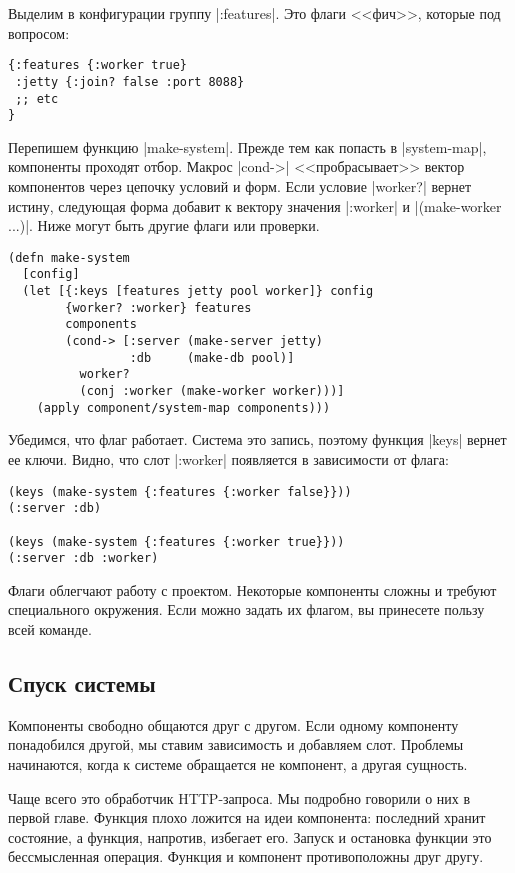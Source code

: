 Выделим в конфигурации группу \spverb|:features|. Это флаги <<фич>>, которые под
вопросом:

\begin{verbatim}
{:features {:worker true}
 :jetty {:join? false :port 8088}
 ;; etc
}
\end{verbatim}

Перепишем функцию \spverb|make-system|. Прежде тем как попасть в
\spverb|system-map|, компоненты проходят отбор. Макрос \spverb|cond->|
<<пробрасывает>> вектор компонентов через цепочку условий и форм. Если условие
\spverb|worker?| вернет истину, следующая форма добавит к вектору значения
\spverb|:worker| и \spverb|(make-worker {...})|. Ниже могут быть другие флаги
или проверки.


\begin{verbatim}
(defn make-system
  [config]
  (let [{:keys [features jetty pool worker]} config
        {worker? :worker} features
        components
        (cond-> [:server (make-server jetty)
                 :db     (make-db pool)]
          worker?
          (conj :worker (make-worker worker)))]
    (apply component/system-map components)))
\end{verbatim}

Убедимся, что флаг работает. Система это запись, поэтому функция \spverb|keys|
вернет ее ключи. Видно, что слот \spverb|:worker| появляется в зависимости от
флага:

\begin{verbatim}
(keys (make-system {:features {:worker false}}))
(:server :db)

(keys (make-system {:features {:worker true}}))
(:server :db :worker)
\end{verbatim}

Флаги облегчают работу с проектом. Некоторые компоненты сложны и требуют
специального окружения. Если можно задать их флагом, вы принесете пользу всей
команде.

\subsection{Спуск системы}

Компоненты свободно общаются друг с другом. Если одному компоненту понадобился
другой, мы ставим зависимость и добавляем слот. Проблемы начинаются, когда к
системе обращается не компонент, а другая сущность.


Чаще всего это обработчик HTTP-запроса. Мы подробно говорили о них в первой
главе. Функция плохо ложится на идеи компонента: последний хранит состояние, а
функция, напротив, избегает его. Запуск и остановка функции это бессмысленная
операция. Функция и компонент противоположны друг другу.


